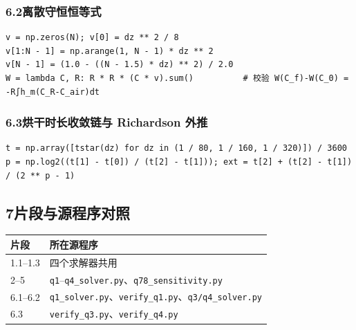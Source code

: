 \documentclass[12pt,a4paper]{ctexart}
\begin{document}
\subsubsection*{6.2\quad 离散守恒恒等式}

\begin{lstlisting}
v = np.zeros(N); v[0] = dz ** 2 / 8
v[1:N - 1] = np.arange(1, N - 1) * dz ** 2
v[N - 1] = (1.0 - ((N - 1.5) * dz) ** 2) / 2.0
W = lambda C, R: R * R * (C * v).sum()          # 校验 W(C_f)-W(C_0) = -R∫h_m(C_R-C_air)dt
\end{lstlisting}

\subsubsection*{6.3\quad 烘干时长收敛链与 Richardson 外推}

\begin{lstlisting}
t = np.array([tstar(dz) for dz in (1 / 80, 1 / 160, 1 / 320)]) / 3600
p = np.log2((t[1] - t[0]) / (t[2] - t[1])); ext = t[2] + (t[2] - t[1]) / (2 ** p - 1)
\end{lstlisting}

\subsection*{7\quad 片段与源程序对照}

\begin{table}[htbp]
\centering
{}
\begin{tabular}{@{}ll@{}}
\toprule
片段 & 所在源程序 \\
\midrule
1.1--1.3 & 四个求解器共用 \\
2--5 & \texttt{q1}--\texttt{q4\_solver.py}、\texttt{q78\_sensitivity.py} \\
6.1--6.2 & \texttt{q1\_solver.py}、\texttt{verify\_q1.py}、\texttt{q3/q4\_solver.py} \\
6.3 & \texttt{verify\_q3.py}、\texttt{verify\_q4.py} \\
\bottomrule
\end{tabular}
\end{table}
\end{document}
